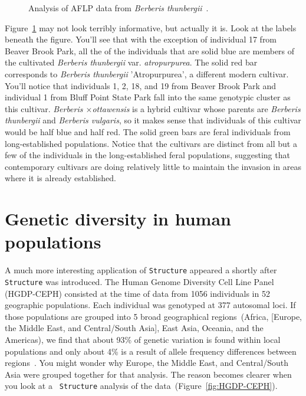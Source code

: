 \documentclass[12pt]{article}
\begin{document}
\begin{figure}
\caption{Analysis of AFLP data from {\it Berberis
    thunbergii}~\cite{Lubell-etal-2008}.}\label{fig:lubell-structure} 
\end{figure}

Figure~\ref{fig:lubell-structure} may not look terribly informative,
but actually it is. Look at the labels beneath the figure. You'll see
that with the exception of individual 17 from Beaver Brook Park, all
the of the individuals that are solid blue are members of the
cultivated {\it Berberis thunbergii\/} var. {\it atropurpurea}. The
solid red bar corresponds to {\it Berberis thunbergii\/}
'Atropurpurea', a different modern cultivar. You'll notice that
individuals 1, 2, 18, and 19 from Beaver Brook Park and individual 1
from Bluff Point State Park fall into the same genotypic cluster as
this cultivar. {\it Berberis $\times$ottawensis} is a hybrid cultivar
whose parents are {\it Berberis thunbergii\/} and {\it Berberis
  vulgaris\/}, so it makes sense that individuals of this cultivar
would be half blue and half red. The solid green bars are feral
individuals from long-established populations. Notice that the
cultivars are distinct from all but a few of the individuals in the
long-established feral populations, suggesting that contemporary
cultivars are doing relatively little to maintain the invasion in
areas where it is already established.

\section*{Genetic diversity in human populations}

A much more interesting application of {\tt Structure} appeared a
shortly after {\tt Structure} was introduced. The Human Genome
Diversity Cell Line Panel (HGDP-CEPH) consisted at
the time of data from 1056 individuals in 52 geographic
populations. Each individual was genotyped at 377 autosomal loci. If
those populations are grouped into 5 broad geographical
regions~(Africa, [Europe, the Middle East, and Central/South Asia],
East Asia, Oceania, and the Americas), we find that about 93\% of
genetic variation is found within local populations and only about 4\%
is a result of allele frequency differences between
regions~\cite{Rosenberg-etal-2002}. You might wonder why Europe, the
Middle East, and Central/South Asia were grouped together for that
analysis. The reason becomes clearer when you look at a {\tt
  Structure} analysis of the data~(Figure~\ref{fig:HGDP-CEPH}).
\end{document}
